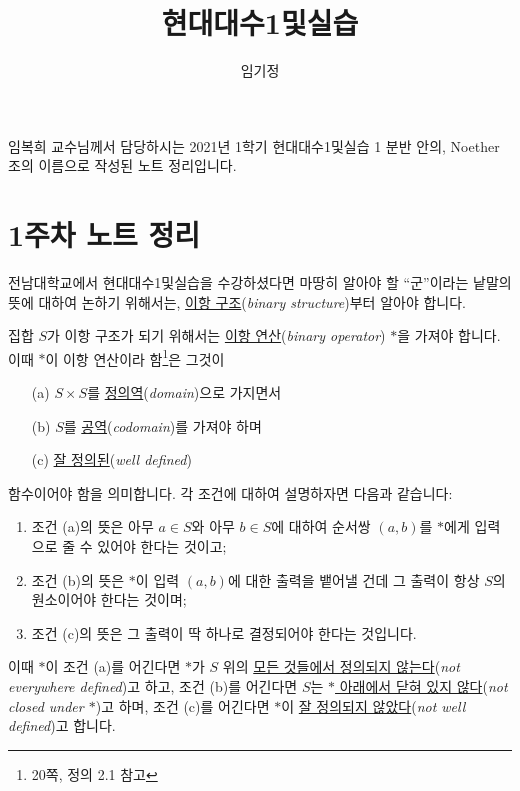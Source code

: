 \documentclass[12pt]{paper}
\title{현대대수1및실습}
\author{임기정}
\begin{document}
  \nocite{fraleigh2009}

  \maketitle
  \hspace{12pt}
  
  임복희 교수님께서 담당하시는 2021년 1학기 현대대수1및실습 1 분반 안의, Noether 조의 이름으로 작성된 노트 정리입니다.

  \section{1주차 노트 정리}
  \hspace{12pt}

  전남대학교에서 현대대수1및실습을 수강하셨다면 마땅히 알아야 할 ``군''이라는 낱말의 뜻에 대하여 논하기 위해서는, \underline{이항 구조}(\textit{binary structure})부터 알아야 합니다.

  집합 $S$가 이항 구조가 되기 위해서는 \underline{이항 연산}(\textit{binary operator}) $*$을 가져야 합니다.
  이때 $*$이 이항 연산이라 함\footnote{\cite{fraleigh2009} 20쪽, 정의 2.1 참고}은 그것이
  \begin{enumerate}
    \item[(a)] $S \times S$를 \underline{정의역}(\textit{domain})으로 가지면서
    \item[(b)] $S$를 \underline{공역}(\textit{codomain})를 가져야 하며
    \item[(c)] \underline{잘 정의된}(\textit{well defined}) 
  \end{enumerate}
  함수이어야 함을 의미합니다.
  각 조건에 대하여 설명하자면 다음과 같습니다:
  \begin{enumerate}
    \item 조건 (a)의 뜻은 아무 $a \in S$와 아무 $b \in S$에 대하여 순서쌍 $\left( a , b \right)$를 $*$에게 입력으로 줄 수 있어야 한다는 것이고;
    \item 조건 (b)의 뜻은 $*$이 입력 $\left( a , b \right)$에 대한 출력을 뱉어낼 건데 그 출력이 항상 $S$의 원소이어야 한다는 것이며;
    \item 조건 (c)의 뜻은 그 출력이 딱 하나로 결정되어야 한다는 것입니다.
  \end{enumerate}
  
  이때 $*$이 조건 (a)를 어긴다면 $*$가 $S$ 위의 \underline{모든 것들에서 정의되지 않는다}(\textit{not everywhere defined})고 하고,
  조건 (b)를 어긴다면 $S$는 \underline{$*$ 아래에서 닫혀 있지 않다}(\textit{not closed under $*$})고 하며,
  조건 (c)를 어긴다면 $*$이 \underline{잘 정의되지 않았다}(\textit{not well defined})고 합니다.
\end{document}
